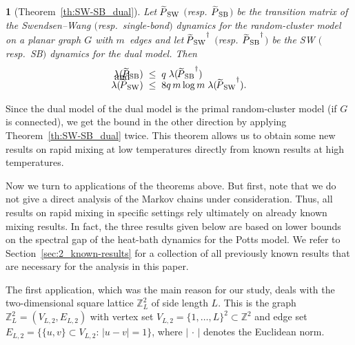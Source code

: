 \documentclass{dis}
\theoremstyle{citing}
\newtheorem{cit}{}
\begin{document}
\begin{cit}[Theorem~\ref{th:SW-SB_dual}]
Let ${{\raisebox{2pt}{ ${\widetilde{{}}}$ }\mkern-14mu P}_{\rm SW}}$ $($resp.~${{\raisebox{2pt}{ ${\widetilde{{}}}$ }\mkern-14mu P}_{\rm SB}}$$)$ be the transition matrix of the 
Swendsen--Wang $($resp.~single-bond$)$ dynamics for the 
random-cluster model on a planar graph $G$ with $m$~edges 
and let ${{\raisebox{2pt}{ ${\widetilde{{}}}$ }\mkern-14mu P}_{\rm SW}}^\dag$ $($resp.~${{\raisebox{2pt}{ ${\widetilde{{}}}$ }\mkern-14mu P}_{\rm SB}}^\dag$$)$ be the SW $($resp.~SB$)$ 
dynamics for the dual model.
Then 
\begin{align*}
\lambda({{\raisebox{2pt}{ ${\widetilde{{}}}$ }\mkern-14mu P}_{\rm SB}}) \;&\le\; q \; \lambda({{\raisebox{2pt}{ ${\widetilde{{}}}$ }\mkern-14mu P}_{\rm SB}}^\dag) \\[-5mm]
\intertext{\vspace*{-3mm} and}
\lambda({{\raisebox{2pt}{ ${\widetilde{{}}}$ }\mkern-14mu P}_{\rm SW}}) \;&\le\; 8q\, m \log m\; \lambda({{\raisebox{2pt}{ ${\widetilde{{}}}$ }\mkern-14mu P}_{\rm SW}}^\dag).
\end{align*}
\vspace{-2mm}
\end{cit}

Since the dual model of the dual model is the primal 
random-cluster model (if $G$ is connected), 
we get the bound in the other direction by applying 
Theorem~\ref{th:SW-SB_dual} twice. 
This theorem allows us to obtain some new results on 
rapid mixing at low temperatures directly 
from known results at high temperatures. 

Now we turn to applications of the theorems above. 
But first, note that we do not give a direct analysis of the 
Markov chains under consideration. 
Thus, all results on rapid mixing in specific 
settings rely ultimately on already known mixing results.  
In fact, the three results given below are based on 
lower bounds on the spectral gap of the heat-bath dynamics 
for the Potts model. 
We refer to Section~\ref{sec:2_known-results} for a 
collection of all previously known results that are 
necessary for the analysis in this paper.

The first application, which was the main reason 
for our study, deals with the two-dimensional 
square lattice ${\ensuremath{\mathbb{Z}}}_L^2$ of side length $L$. 
This is the graph ${\ensuremath{\mathbb{Z}}}^2_L=(V_{L,2},E_{L,2})$ 
with vertex set $V_{L,2}=\{1,\dots,L\}^2\subset{\ensuremath{\mathbb{Z}}}^2$ and edge set 
$E_{L,2}=\bigl\{\{u,v\}\subset V_{L,2}:\,{\left\vert {u-v} \right\vert}=1\bigr\}$, 
where ${\left\vert {\,\cdot\,} \right\vert}$ denotes the Euclidean norm.
\end{document}
